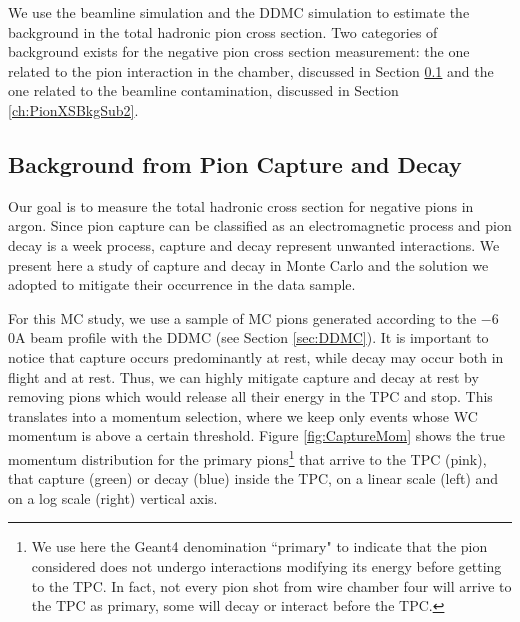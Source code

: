 We use the beamline simulation and the DDMC simulation to estimate the background in the total hadronic pion cross section. Two categories of background exists for the negative pion cross section measurement: the one related to the pion interaction in the chamber, discussed in Section \ref{ch:CaptureAndDecay} and the one related to the beamline contamination, discussed in Section \ref{ch:PionXSBkgSub2}.

\subsection{Background from Pion Capture and Decay}\label{ch:CaptureAndDecay}
Our goal is to measure the total hadronic cross section for negative pions in argon. Since pion capture can be classified as an electromagnetic process and pion decay is a week process,  capture and decay represent unwanted interactions. We present here a study of capture and decay in Monte Carlo and the solution we adopted to mitigate their occurrence in the data sample. 

For this MC study, we use a sample of  MC pions generated according to the  $-6$0A beam profile with the DDMC (see Section \ref{sec:DDMC}). It is important to notice that capture occurs predominantly at rest, while decay may occur both in flight and at rest. Thus, we can highly mitigate capture and decay at rest by removing pions which would release all their energy in the TPC and stop. This translates into a momentum selection, where we keep only events whose WC momentum is above a certain threshold. 
Figure \ref{fig:CaptureMom} shows the true momentum distribution for the primary pions\footnote{We use here the Geant4 denomination ``primary" to indicate that the pion considered does not undergo interactions modifying its energy before getting to the TPC. In fact, not every pion shot from wire chamber four will arrive to the TPC as primary,  some will decay or interact before the TPC.}  that arrive to the TPC (pink), that capture (green) or decay (blue) inside the TPC, on a linear scale (left) and on a log scale (right) vertical axis. 




